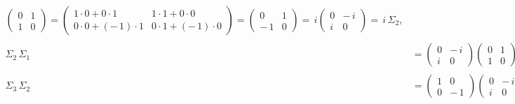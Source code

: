 \documentclass{article}
\theoremstyle{plain}
\theoremstyle{definition}
\theoremstyle{remark}
\begin{document}
\begin{enumerate}
\begin{align*}
            \begin{pmatrix} 0 & 1 \\[4pt] 1 & 0 \end{pmatrix}
            =
            \begin{pmatrix}
            1\cdot 0 + 0\cdot 1 & 1\cdot 1 + 0\cdot 0 \\[6pt]
            0\cdot 0 + (-\,1)\cdot 1 & 0\cdot 1 + (-\,1)\cdot 0
            \end{pmatrix}
            =
            \begin{pmatrix} 0 & 1 \\[4pt] -\,1 & 0 \end{pmatrix}
            =\,i
            \begin{pmatrix} 0 & -\,i \\[4pt] i & 0 \end{pmatrix}
            =\,i\,\Sigma_2, \\[1em]
            \Sigma_2\,\Sigma_1
            &=
            \begin{pmatrix} 0 & -\,i \\[4pt] i & 0 \end{pmatrix}
            \begin{pmatrix} 0 & 1 \\[4pt] 1 & 0 \end{pmatrix}
            =
            \begin{pmatrix}
            0\cdot 0 + (-\,i)\cdot 1 & 0\cdot 1 + (-\,i)\cdot 0 \\[6pt]
            i\cdot 0 + 0\cdot 1 & i\cdot 1 + 0\cdot 0
            \end{pmatrix}
            =
            \begin{pmatrix} -\,i & 0 \\[4pt] 0 & i \end{pmatrix}
            =\,-\,i
            \begin{pmatrix} 1 & 0 \\[4pt] 0 & -\,1 \end{pmatrix}
            =\,-\,i\,\Sigma_3, \\[1em]
            \Sigma_3\,\Sigma_2
            &=
            \begin{pmatrix} 1 & 0 \\[4pt] 0 & -\,1 \end{pmatrix}
            \begin{pmatrix} 0 & -\,i \\[4pt] i & 0 \end{pmatrix}

\end{align*}
\end{enumerate}
\end{document}
